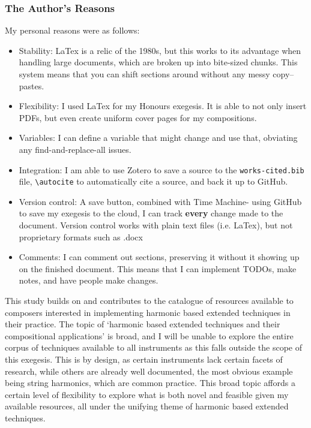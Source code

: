 \subsubsection{The Author's Reasons}
My personal reasons were as follows:
\begin{itemize}
    \item Stability: LaTex is a relic of the 1980s, but this works to its advantage when handling large documents, which are broken up into bite-sized chunks. This system means that you can shift sections around without any messy copy--pastes.
    \item Flexibility: I used LaTex for my Honours exegesis. It is able to not only insert PDFs, but even create uniform cover pages for my compositions.
    \item Variables: I can define a variable that might change and use that, obviating any find-and-replace-all issues.
    \item Integration: I am able to use Zotero to save a source to the \lstinline{works-cited.bib} file, \lstinline{\autocite} to automatically cite a source, and back it up to GitHub.
    \item Version control: A save button, combined with Time Machine- using GitHub to save my exegesis to the cloud, I can track \textbf{every} change made to the document. Version control works with plain text files (i.e. LaTex), but not proprietary formats such as .docx
    \item Comments: I can comment out sections, preserving it without it showing up on the finished document. This means that I can implement TODOs, make notes, and have people make changes.
\end{itemize}



This study builds on and contributes to the catalogue of resources available to composers interested in implementing harmonic based extended techniques in their practice. 
The topic of `harmonic based extended techniques and their compositional applications' is broad, and I will be unable to explore the entire corpus of techniques available to all instruments as this falls outside the scope of this exegesis. 
This is by design, as certain instruments lack certain facets of research, while others are already well documented, the most obvious example being string harmonics, which are common practice. 
This broad topic affords a certain level of flexibility to explore what is both novel and feasible given my available resources, all under the unifying theme of harmonic based extended techniques.

